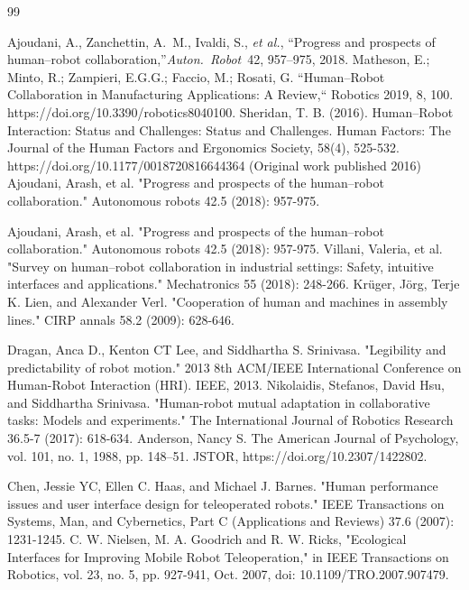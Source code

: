 
\begin{thebibliography}{99}
    
Ajoudani, A., Zanchettin, A.~M., Ivaldi, S., \textit{et al.}, ``Progress and prospects of human--robot collaboration,''\textit{Auton.\ Robot}~42, 957--975, 2018.
Matheson, E.; Minto, R.; Zampieri, E.G.G.; Faccio, M.; Rosati, G. ``Human–Robot Collaboration in Manufacturing Applications: A Review,`` Robotics 2019, 8, 100. https://doi.org/10.3390/robotics8040100.
Sheridan, T. B. (2016). Human–Robot Interaction: Status and Challenges: Status and Challenges. Human Factors: The Journal of the Human Factors and Ergonomics Society, 58(4), 525-532. https://doi.org/10.1177/0018720816644364 (Original work published 2016)
Ajoudani, Arash, et al. "Progress and prospects of the human–robot collaboration." Autonomous robots 42.5 (2018): 957-975.

Ajoudani, Arash, et al. "Progress and prospects of the human–robot collaboration." Autonomous robots 42.5 (2018): 957-975.
Villani, Valeria, et al. "Survey on human–robot collaboration in industrial settings: Safety, intuitive interfaces and applications." Mechatronics 55 (2018): 248-266.
Krüger, Jörg, Terje K. Lien, and Alexander Verl. "Cooperation of human and machines in assembly lines." CIRP annals 58.2 (2009): 628-646.


Dragan, Anca D., Kenton CT Lee, and Siddhartha S. Srinivasa. "Legibility and predictability of robot motion." 2013 8th ACM/IEEE International Conference on Human-Robot Interaction (HRI). IEEE, 2013.
Nikolaidis, Stefanos, David Hsu, and Siddhartha Srinivasa. "Human-robot mutual adaptation in collaborative tasks: Models and experiments." The International Journal of Robotics Research 36.5-7 (2017): 618-634.
Anderson, Nancy S. The American Journal of Psychology, vol. 101, no. 1, 1988, pp. 148–51. JSTOR, https://doi.org/10.2307/1422802. 

Chen, Jessie YC, Ellen C. Haas, and Michael J. Barnes. "Human performance issues and user interface design for teleoperated robots." IEEE Transactions on Systems, Man, and Cybernetics, Part C (Applications and Reviews) 37.6 (2007): 1231-1245.
C. W. Nielsen, M. A. Goodrich and R. W. Ricks, "Ecological Interfaces for Improving Mobile Robot Teleoperation," in IEEE Transactions on Robotics, vol. 23, no. 5, pp. 927-941, Oct. 2007, doi: 10.1109/TRO.2007.907479. 


\end{thebibliography}
